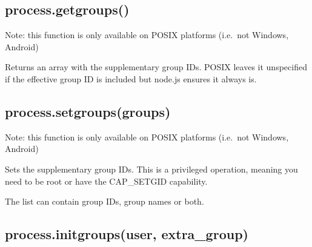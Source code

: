 \begin{Shaded}
\begin{Highlighting}[]
 \NormalTok{(} \NormalTok{&& }\NormalTok{) \{}
  \NormalTok{(} \NormalTok{+ }\NormalTok{());}
   \NormalTok{\{}
    \NormalTok{(}\NormalTok{);}
    \NormalTok{(} \NormalTok{+ }\NormalTok{());}
  \NormalTok{\}}
   
    \NormalTok{(} 
  \NormalTok{\}}
\NormalTok{\}}
\end{Highlighting}
\end{Shaded}

\subsection{process.getgroups()}\label{process.getgroups}

Note: this function is only available on POSIX platforms (i.e.~not
Windows, Android)

Returns an array with the supplementary group IDs. POSIX leaves it
unspecified if the effective group ID is included but node.js ensures it
always is.

\subsection{process.setgroups(groups)}\label{process.setgroupsgroups}

Note: this function is only available on POSIX platforms (i.e.~not
Windows, Android)

Sets the supplementary group IDs. This is a privileged operation,
meaning you need to be root or have the CAP\_SETGID capability.

The list can contain group IDs, group names or both.

\subsection{process.initgroups(user,
extra\_group)}\label{process.initgroupsuser-extraux5fgroup}

